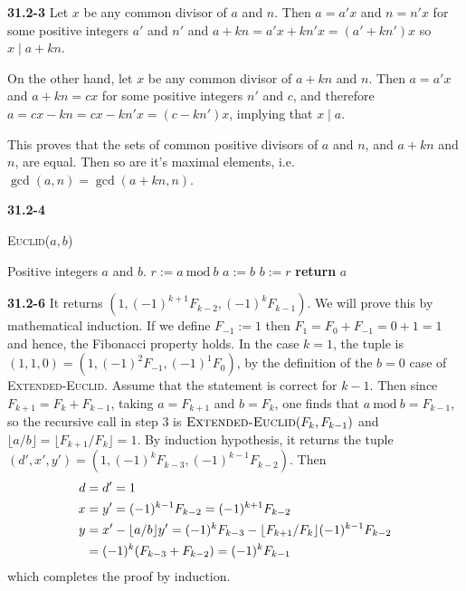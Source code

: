 \documentclass[12pt]{amsart}
\numberwithin{equation}{section}
\renewcommand{\mod}{\mathrm{\ mod\ }}
\renewcommand{\(}{\left(}
\renewcommand{\)}{\right)}
\renewcommand{\[}{\left[}
\renewcommand{\]}{\right]}
\begin{document}
\bigskip

\noindent \textbf{31.2-3} Let $x$ be any common divisor of $a$ and $n$. Then $a=a'x$ and $n=n'x$ for some positive integers $a'$ and $n'$ and $a+kn = a'x+kn'x = (a'+kn')x$ so $x\mid a+kn$.

On the other hand, let $x$ be any common divisor of $a+kn$ and $n$. Then $a=a'x$ and $a+kn=cx$ for some positive integers $n'$ and $c$, and therefore $a = cx - kn = cx-kn'x=(c-kn')x$, implying that $x\mid a$.

This proves that the sets of common positive divisors of $a$ and $n$, and $a+kn$ and $n$, are equal. Then so are it's maximal elements, i.e. $\gcd(a,n)=\gcd(a+kn,n)$.


\bigskip


\noindent \textbf{31.2-4}

\begin{algorithm}[H]
\caption{\textsc{Euclid}($a,b$)}
\begin{algorithmic}[1]
\REQUIRE Positive integers $a$ and $b$.
    \STATE $r:=a \mod b$
    \STATE $a:=b$
    \STATE $b:=r$
\ENDWHILE
\STATE \textbf{return} $a$
\end{algorithmic}
\end{algorithm}


\bigskip

\noindent \textbf{31.2-6} It returns $(1, (-1)^{k+1}F_{k-2}, (-1)^kF_{k-1})$. We will prove this by mathematical induction. If we define $F_{-1}:=1$ then $F_1 = F_0 + F_{-1} = 0+1 = 1$ and hence, the Fibonacci property holds. In the case $k=1$, the tuple is $(1, 1, 0) = (1, (-1)^2F_{-1}, (-1)^1 F_0)$, by the definition of the $b=0$ case of \textsc{Extended-Euclid}. Assume that the statement is correct for $k-1$. Then since $F_{k+1}=F_k+F_{k-1}$, taking $a=F_{k+1}$ and $b=F_k$, one finds that $a \mod b = F_{k-1}$, so the recursive call in step 3 is $\textsc{Extended-Euclid}(F_k, F_{k-1})$ and $\lfloor a/b \rfloor = \lfloor F_{k+1}/F_k \rfloor=1$. By induction hypothesis, it returns the tuple $(d', x', y') = (1, (-1)^{k}F_{k-3}, (-1)^{k-1}F_{k-2})$. Then
$$
\aligned
d &= d' = 1\\
x &= y' = (-1)^{k-1}F_{k-2} = (-1)^{k+1}F_{k-2}\\
y &= x' - \lfloor a/b\rfloor y' = (-1)^{k}F_{k-3} - \lfloor F_{k+1}/F_k \rfloor (-1)^{k-1}F_{k-2} \\
&= (-1)^{k} (F_{k-3} + F_{k-2}) = (-1)^{k} F_{k-1}
\endaligned
$$
which completes the proof by induction.


\bigskip
\end{document}
